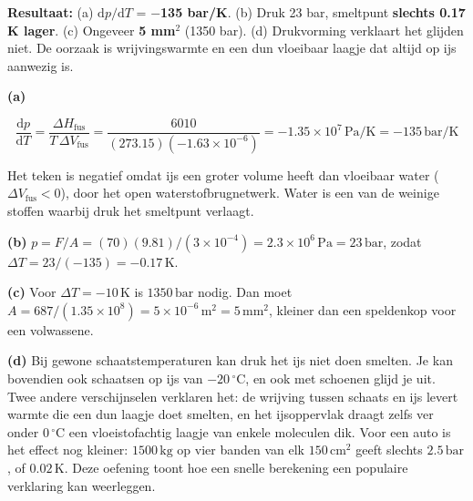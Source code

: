 \begin{oplossing}
\textbf{Resultaat:} (a) \(\mathrm{d}p/\mathrm{d}T\) = \textbf{\ensuremath{-}135 bar/K}. (b) Druk 23 bar, smeltpunt \textbf{slechts 0.17 K lager}. (c) Ongeveer \textbf{5 mm\ensuremath{^{2}}} (1350 bar). (d) Drukvorming verklaart het glijden niet. De oorzaak is wrijvingswarmte en een dun vloeibaar laagje dat altijd op ijs aanwezig is.

\textbf{(a)}

\[
\frac{\mathrm{d}p}{\mathrm{d}T} = \frac{\Delta H_{\text{fus}}}{T\,\Delta V_{\text{fus}}} = \frac{6010}{(273.15)(-1.63\times10^{-6})} = -1.35\times10^{7}\,\mathrm{Pa/K} = -135\,\mathrm{bar/K}
\]

Het teken is negatief omdat ijs een groter volume heeft dan vloeibaar water (\(\Delta V_{\text{fus}} < 0\)), door het open waterstofbrugnetwerk. Water is een van de weinige stoffen waarbij druk het smeltpunt verlaagt.

\textbf{(b)} \(p = F/A = (70)(9.81)/(3\times10^{-4}) = 2.3\times10^{6}\,\mathrm{Pa} = 23\,\mathrm{bar}\), zodat \(\Delta T = 23/(-135) = -0.17\,\mathrm{K}\).

\textbf{(c)} Voor \(\Delta T = -10\,\mathrm{K}\) is \(1350\,\mathrm{bar}\) nodig. Dan moet \(A = 687/(1.35\times10^{8}) = 5\times10^{-6}\,\mathrm{m^2} = 5\,\mathrm{mm^2}\), kleiner dan een speldenkop voor een volwassene.

\textbf{(d)} Bij gewone schaatstemperaturen kan druk het ijs niet doen smelten. Je kan bovendien ook schaatsen op ijs van \(-20\,^\circ\mathrm{C}\), en ook met schoenen glijd je uit. Twee andere verschijnselen verklaren het: de wrijving tussen schaats en ijs levert warmte die een dun laagje doet smelten, en het ijsoppervlak draagt zelfs ver onder \(0\,^\circ\mathrm{C}\) een vloeistofachtig laagje van enkele moleculen dik. Voor een auto is het effect nog kleiner: \(1500\,\mathrm{kg}\) op vier banden van elk \(150\,\mathrm{cm^2}\) geeft slechts \(2.5\,\mathrm{bar}\), of \(0.02\,\mathrm{K}\). Deze oefening toont hoe een snelle berekening een populaire verklaring kan weerleggen.
\end{oplossing}

